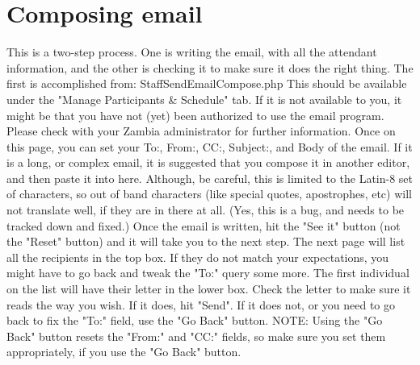 \documentclass[captions=tablesignature]{scrartcl}
\begin{document}
\section{Composing email}
\label{sec-5}
This is a two-step process.  One is writing the email, with all the
attendant information, and the other is checking it to make sure it
does the right thing.
The first is accomplished from:
StaffSendEmailCompose.php
This should be available under the "Manage Participants \& Schedule"
tab.  If it is not available to you, it might be that you have not
(yet) been authorized to use the email program.  Please check with
your Zambia administrator for further information.
Once on this page, you can set your To:, From:, CC:, Subject:, and
Body of the email.
If it is a long, or complex email, it is suggested that you compose
it in another editor, and then paste it into here.  Although, be
careful, this is limited to the Latin-8 set of characters, so out of
band characters (like special quotes, apostrophes, etc) will not
translate well, if they are in there at all.  (Yes, this is a bug,
and needs to be tracked down and fixed.)
Once the email is written, hit the "See it" button (not the "Reset"
button) and it will take you to the next step.
The next page will list all the recipients in the top box.  If
they do not match your expectations, you might have to go back and
tweak the "To:" query some more.
The first individual on the list will have their letter in the lower
box.  Check the letter to make sure it reads the way you wish.  If
it does, hit "Send".  If it does not, or you need to go back to fix
the "To:" field, use the "Go Back" button.
NOTE: Using the "Go Back" button resets the "From:" and "CC:"
fields, so make sure you set them appropriately, if you use the "Go
Back" button.
\end{document}
